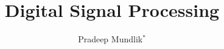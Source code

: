 \documentclass[journal,12pt,twocolumn]{IEEEtran}
\begin{document}
     \def\rightbox#1{\makebox[0in][r]{#1}}
     \def\centbox#1{\makebox[0in]{#1}}
     \def\topbox#1{\raisebox{-\baselineskip}[0in][0in]{#1}}
     \def\midbox#1{\raisebox{-0.5\baselineskip}[0in][0in]{#1}}
\vspace{3cm}
\title{ 
Digital Signal Processing
}
%
%
%
\author{ Pradeep Mundlik$^{*}$ %
}
% 
%
\end{document}
